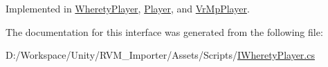 Implemented in \mbox{\hyperlink{class_wherety_player_a932686a63036f030e38a10f361d9d5d3}{Wherety\+Player}}, \mbox{\hyperlink{class_player_ac8cf603009908d2e9b95fc4aff6ced70}{Player}}, and \mbox{\hyperlink{class_vr_mp_player_a4f5c36d5a2629d9300f4aec04803e8f3}{Vr\+Mp\+Player}}.



The documentation for this interface was generated from the following file\+:\begin{DoxyCompactItemize}
\item 
D\+:/\+Workspace/\+Unity/\+R\+V\+M\+\_\+\+Importer/\+Assets/\+Scripts/\mbox{\hyperlink{_i_wherety_player_8cs}{I\+Wherety\+Player.\+cs}}\end{DoxyCompactItemize}
